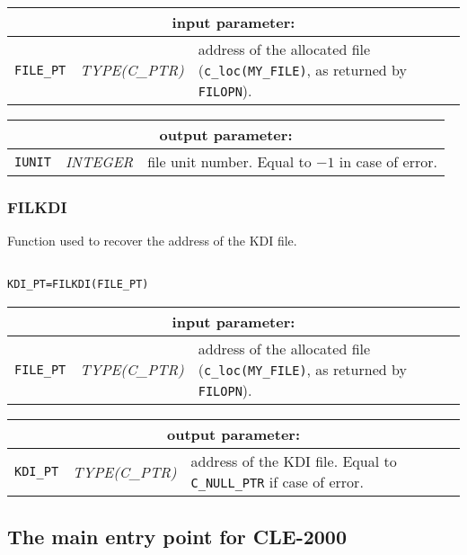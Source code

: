 \noindent
\begin{tabular}{|p{1.5cm}|p{3cm}|p{10cm}|}
\hline
\multicolumn{3}{|c|}{\bf input parameter:} \\
\hline
{\tt FILE\_PT} & {\it TYPE(C\_PTR)} &  address of the allocated file ({\tt c\_loc(MY\_FILE)}, as returned by {\tt FILOPN}). \\
\hline
\end{tabular}

\vskip 0.4cm
\noindent
\begin{tabular}{|p{1.5cm}|p{3cm}|p{10cm}|}
\hline
\multicolumn{3}{|c|}{\bf output parameter:} \\
\hline
{\tt IUNIT} & {\it INTEGER}  & file unit number. Equal to $-1$ in case of error. \\
\hline
\end{tabular}

\subsubsection{FILKDI}

Function used to recover the address of the KDI file.

\begin{verbatim}

KDI_PT=FILKDI(FILE_PT)
\end{verbatim}

\noindent
\begin{tabular}{|p{1.5cm}|p{3cm}|p{10cm}|}
\hline
\multicolumn{3}{|c|}{\bf input parameter:} \\
\hline
{\tt FILE\_PT} & {\it TYPE(C\_PTR)} &  address of the allocated file ({\tt c\_loc(MY\_FILE)}, as returned by {\tt FILOPN}). \\
\hline
\end{tabular}

\vskip 0.4cm
\noindent
\begin{tabular}{|p{1.5cm}|p{3cm}|p{10cm}|}
\hline
\multicolumn{3}{|c|}{\bf output parameter:} \\
\hline
{\tt KDI\_PT} & {\it TYPE(C\_PTR)}  & address of the KDI file. Equal to {\tt C\_NULL\_PTR} if case of error.  \\
\hline
\end{tabular}

\vskip 0.8cm

\subsection {The main entry point for CLE-2000}

